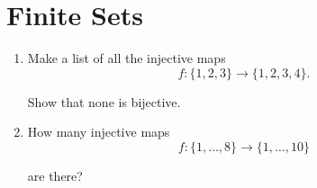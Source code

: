 \section{Finite Sets}

\begin{exercise}\label{chapter1:section6:exercise1}
    \begin{enumerate}[label={(\alph*)}]
        \item Make a list of all the injective maps
              \[
                  f: \{ 1, 2, 3 \}\to \{ 1, 2, 3, 4 \}.
              \]

              Show that none is bijective.
        \item How many injective maps
              \[
                  f: \{ 1, \ldots, 8 \}\to \{ 1, \ldots, 10 \}
              \]

              are there?
    \end{enumerate}
\end{exercise}

